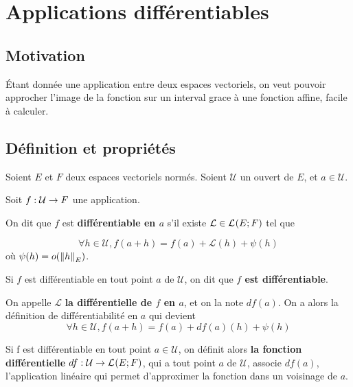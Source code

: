 \chapter{Applications différentiables}
\label{chap:differential}

\section*{Motivation}
	Étant donnée une application entre deux espaces vectoriels, on veut pouvoir
	approcher l'image de la fonction sur un interval grace à une fonction
	affine, facile à calculer.


\section{Définition et propriétés}


\begin{definition} 
\label{a_differential}
	Soient $E$ et $F$ deux espaces vectoriels normés.
	Soient $\mathcal{U}$ un ouvert de $E$, et $a \in \mathcal{U}$.

	Soit $f : \mathcal{U} \rightarrow F$ une application.

	On dit que $f$ est \textbf{différentiable en $a$} s'il existe $\mathcal{L}
	\in \mathcal{L}_{}(E; F)$ tel que

	\begin{equation}
		\forall h \in \mathcal{U}, f(a + h) = f(a) + \mathcal{L}(h) + \psi(h)
	\end{equation}
	où $\psi(h) = o(\norm{h}_{E})$.

	Si $f$ est différentiable en tout point $a$ de $\mathcal{U}$, on dit que
	\textbf{$f$ est différentiable}.
\end{definition}

On appelle $\mathcal{L}$ \textbf{la différentielle de $f$ en $a$}, et on la note
$df(a)$. On a alors la définition de différentiabilité en $a$ qui devient
\begin{equation}
	\forall h \in \mathcal{U}, f(a + h) = f(a) + df(a)(h) + \psi(h)
\end{equation}

Si f est différentiable en tout point $a \in \mathcal{U}$, on définit alors
\textbf{la fonction différentielle}
$df : \mathcal{U} \rightarrow \mathcal{L}_{}(E; F)$, qui a tout point $a$
de $\mathcal{U}$, associe $df(a)$, l'application linéaire qui permet
d'approximer la fonction dans un voisinage de $a$.

